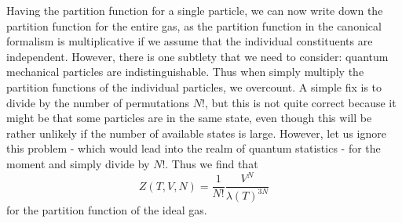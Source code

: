 \documentclass[a4paper, draft]{report}
\numberwithin{section}{chapter}
\numberwithin{equation}{chapter}
\theoremstyle{own}
\theoremstyle{remark}
\begin{document}
Having the partition function for a single particle, we can now write down the partition function for the entire gas, as the partition function in the canonical formalism is multiplicative if we assume that the individual constituents are independent. However, there is one subtlety that we need to consider: quantum mechanical particles are indistinguishable. Thus when simply multiply the partition functions of the individual particles, we overcount. A simple fix is to divide by the number of permutations $N!$, but this is not quite correct because it might be that some particles are in the same state, even though this will be rather unlikely if the number of available states is large. However, let us ignore this problem - which would lead into the realm of quantum statistics - for the moment and simply divide by $N!$. Thus we find that
$$
Z(T,V,N) = \frac{1}{N!} \frac{V^N}{\lambda(T)^{3N}}
$$
for the partition function of the ideal gas. 
\end{document}
